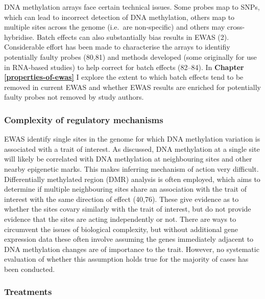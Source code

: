 \documentclass[11pt,oneside]{bristolthesis}
\begin{document}
DNA methylation arrays face certain technical issues. Some probes map to SNPs, which can lead to incorrect detection of DNA methylation, others map to multiple sites across the genome (i.e.~are non-specific) and others may cross-hybridise. Batch effects can also substantially bias results in EWAS (2). Considerable effort has been made to characterise the arrays to identifiy potentially faulty probes (80,81) and methods developed (some originally for use in RNA-based studies) to help correct for batch effects (82--84). In \textbf{Chapter \ref{properties-of-ewas}} I explore the extent to which batch effects tend to be removed in current EWAS and whether EWAS results are enriched for potentially faulty probes not removed by study authors.

\hypertarget{complexity-of-regulatory-mechanisms}{%
\subsubsection{Complexity of regulatory mechanisms}\label{complexity-of-regulatory-mechanisms}}

EWAS identify single sites in the genome for which DNA methylation variation is associated with a trait of interest. As discussed, DNA methylation at a single site will likely be correlated with DNA methylation at neighbouring sites and other nearby epigenetic marks. This makes inferring mechanism of action very difficult. Differentially methylated region (DMR) analysis is often employed, which aims to determine if multiple neighbouring sites share an association with the trait of interest with the same direction of effect (40,76). These give evidence as to whether the sites covary similarly with the trait of interest, but do not provide evidence that the sites are acting independently or not. There are ways to circumvent the issues of biological complexity, but without additional gene expression data these often involve assuming the genes immediately adjacent to DNA methylation changes are of importance to the trait. However, no systematic evaluation of whether this assumption holds true for the majority of cases has been conducted.

\hypertarget{treatments}{%
\subsubsection{Treatments}\label{treatments}}
\end{document}
